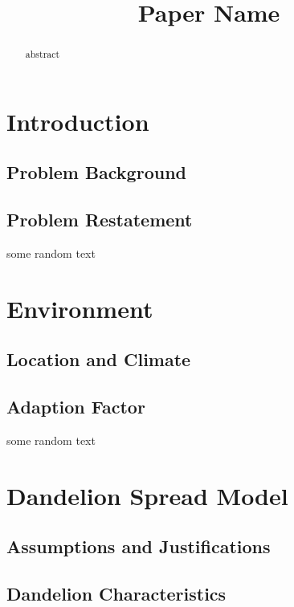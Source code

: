 \documentclass[12pt]{article}
\title{Paper Name}  %
\begin{document}
\begin{abstract}

	abstract

\end{abstract}

\maketitle
\tableofcontents





\section{Introduction}

	\subsection{Problem Background}
	
	\subsection{Problem Restatement}
	
	some random text
	
\section{Environment}

	\subsection{Location and Climate}
	
	\subsection{Adaption Factor}
	
	some random text

\section{Dandelion Spread Model}

	\subsection{Assumptions and Justifications}

	\subsection{Dandelion Characteristics}
	
\end{document}
